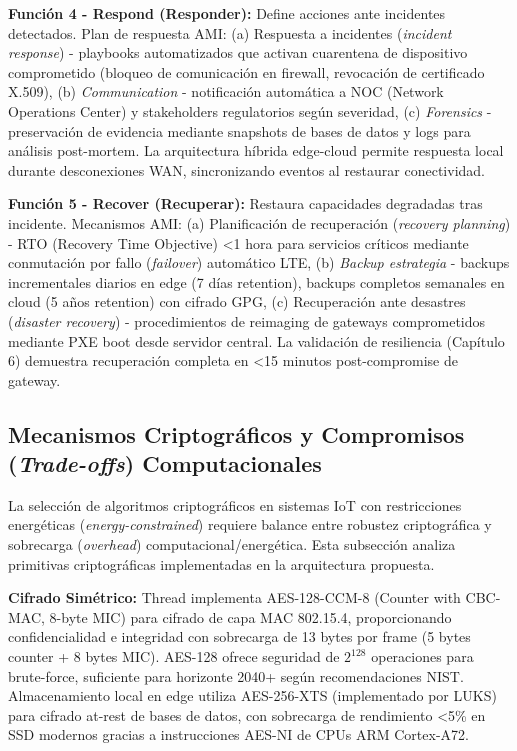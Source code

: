 \textbf{Función 4 - Respond (Responder):} Define acciones ante incidentes detectados. Plan de respuesta AMI: (a) Respuesta a incidentes (\textit{incident response}) - playbooks automatizados que activan cuarentena de dispositivo comprometido (bloqueo de comunicación en firewall, revocación de certificado X.509), (b) \textit{Communication} - notificación automática a NOC (Network Operations Center) y stakeholders regulatorios según severidad, (c) \textit{Forensics} - preservación de evidencia mediante snapshots de bases de datos y logs para análisis post-mortem. La arquitectura híbrida edge-cloud permite respuesta local durante desconexiones WAN, sincronizando eventos al restaurar conectividad.

\textbf{Función 5 - Recover (Recuperar):} Restaura capacidades degradadas tras incidente. Mecanismos AMI: (a) Planificación de recuperación (\textit{recovery planning}) - RTO (Recovery Time Objective) <1 hora para servicios críticos mediante conmutación por fallo (\textit{failover}) automático LTE, (b) \textit{Backup estrategia} - backups incrementales diarios en edge (7 días retention), backups completos semanales en cloud (5 años retention) con cifrado GPG, (c) Recuperación ante desastres (\textit{disaster recovery}) - procedimientos de reimaging de gateways comprometidos mediante PXE boot desde servidor central. La validación de resiliencia (Capítulo 6) demuestra recuperación completa en <15 minutos post-compromise de gateway.

\subsection{Mecanismos Criptográficos y Compromisos (\textit{Trade-offs}) Computacionales}
\label{sec:marco-seguridad-cripto}

La selección de algoritmos criptográficos en sistemas IoT con restricciones energéticas (\textit{energy-constrained}) requiere balance entre robustez criptográfica y sobrecarga (\textit{overhead}) computacional/energética. Esta subsección analiza primitivas criptográficas implementadas en la arquitectura propuesta.

\textbf{Cifrado Simétrico:} Thread implementa AES-128-CCM-8 (Counter with CBC-MAC, 8-byte MIC) para cifrado de capa MAC 802.15.4, proporcionando confidencialidad e integridad con sobrecarga de 13 bytes por frame (5 bytes counter + 8 bytes MIC). AES-128 ofrece seguridad de $2^{128}$ operaciones para brute-force, suficiente para horizonte 2040+ según recomendaciones NIST. Almacenamiento local en edge utiliza AES-256-XTS (implementado por LUKS) para cifrado at-rest de bases de datos, con sobrecarga de rendimiento <5\% en SSD modernos gracias a instrucciones AES-NI de CPUs ARM Cortex-A72.

